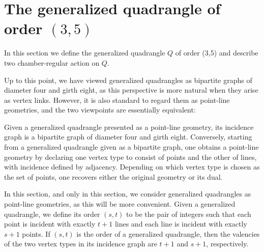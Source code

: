 \documentclass[dvipsnames]{article}
\theoremstyle{definition}
\theoremstyle{remark}
\begin{document}
    
\section{The generalized quadrangle of order $(3,5)$}\label{sec:quadrangle_Q}
    In this section we define the generalized quadrangle $Q$ of order (3,5) and describe two chamber-regular action on $Q$.
    
    Up to this point, we have viewed generalized quadrangles as bipartite graphs of diameter four and girth eight, as this perspective is more natural when they arise as vertex links. However, it is also standard to regard them as point-line geometries, and the two viewpoints are essentially equivalent:

    Given a generalized quadrangle presented as a point-line geometry, its incidence graph is a bipartite graph of diameter four and girth eight. Conversely, starting from a generalized quadrangle given as a bipartite graph, one obtains a point-line geometry by declaring one vertex type to consist of points and the other of lines, with incidence defined by adjacency. Depending on which vertex type is chosen as the set of points, one recovers either the original geometry or its dual.

    In this section, and only in this section, we consider generalized quadrangles as point-line geometries, as this will be more convenient. Given a generalized quadrangle, we define its order $(s,t)$ to be the pair of integers such that each point is incident with exactly $t+1$ lines and each line is incident with exactly $s+1$ points. If $(s,t)$ is the order of a generalized quadrangle, then the valencies of the two vertex types in its incidence graph are $t+1$ and $s+1$, respectively.
    
\end{document}
